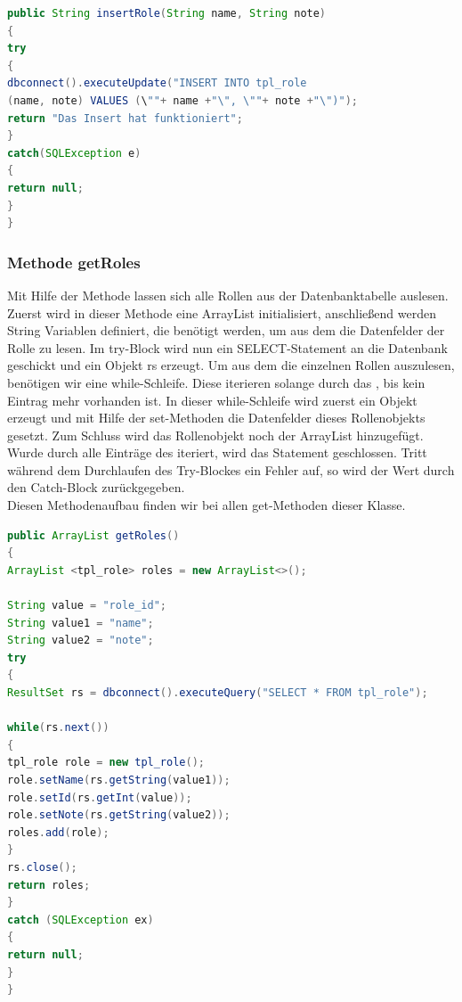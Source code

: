 \begin{lstlisting}[language=JAVA, caption=Datenbankanbindung.java/Methode-dbconnect, firstnumber=271]
public String insertRole(String name, String note)
{
try
{
dbconnect().executeUpdate("INSERT INTO tpl_role 
(name, note) VALUES (\""+ name +"\", \""+ note +"\")");
return "Das Insert hat funktioniert";
}
catch(SQLException e)
{
return null;
}
}
\end{lstlisting}
\newpage
\subsubsection{Methode getRoles\(\)}

Mit Hilfe der Methode  lassen sich alle Rollen aus der Datenbanktabelle  auslesen.
Zuerst wird in dieser Methode eine ArrayList  initialisiert, anschließend werden String Variablen definiert, die benötigt werden, um aus dem  die Datenfelder der Rolle zu lesen.
Im try-Block wird nun ein SELECT-Statement an die Datenbank geschickt und ein  Objekt rs erzeugt. 
Um aus dem  die einzelnen Rollen auszulesen, benötigen wir eine while-Schleife. Diese iterieren solange durch das , bis kein Eintrag mehr vorhanden ist.
In dieser while-Schleife wird zuerst ein  Objekt erzeugt und mit Hilfe der set-Methoden die Datenfelder dieses Rollenobjekts gesetzt. Zum Schluss wird das Rollenobjekt noch der ArrayList  hinzugefügt. Wurde durch alle Einträge des  iteriert, wird das Statement geschlossen. Tritt während dem Durchlaufen des Try-Blockes ein Fehler auf, so wird der Wert  durch den Catch-Block zurückgegeben.\\ 
Diesen Methodenaufbau finden wir bei allen get-Methoden dieser Klasse.

\newpage


\begin{lstlisting}[language=JAVA, caption=Datenbankanbindung.java/Methode-getRoles, firstnumber=59]
public ArrayList getRoles()
{
ArrayList <tpl_role> roles = new ArrayList<>();

String value = "role_id";
String value1 = "name";
String value2 = "note";
try 
{
ResultSet rs = dbconnect().executeQuery("SELECT * FROM tpl_role");

while(rs.next())
{
tpl_role role = new tpl_role();
role.setName(rs.getString(value1));
role.setId(rs.getInt(value));
role.setNote(rs.getString(value2));
roles.add(role);
}
rs.close();
return roles;
} 
catch (SQLException ex) 
{
return null;
}
}
\end{lstlisting}

\renewcommand{\arraystretch}{1}

\newpage

